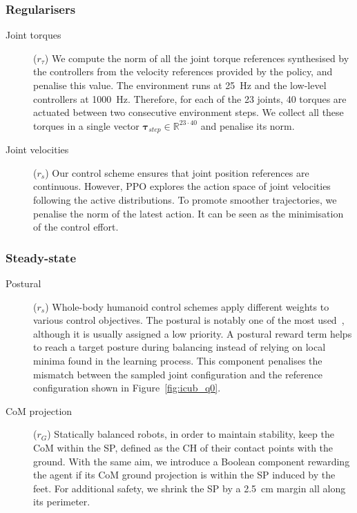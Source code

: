 \pagebreak
\begin{addmargin}{0cm}
\vspace*{-1cm}

\subsubsection{Regularisers}

\begin{description}

\item[Joint torques]\!($r_\tau$)\;
%
We compute the norm of all the joint torque references synthesised by the \pid controllers from the velocity references provided by the policy, and penalise this value.
The environment runs at 25~Hz and the low-level controllers at 1000~Hz.
Therefore, for each of the 23 joints, 40 torques are actuated between two consecutive environment steps.
We collect all these torques in a single vector $\boldsymbol{\tau}_{step} \in \mathbb{R}^{23\cdot40}$ and penalise its norm.

\item[Joint velocities]\!($r_{\dot{s}}$)\;
%
Our control scheme ensures that joint position references are continuous.
However, \ac{PPO} explores the action space of joint velocities following the active distributions.
To promote smoother trajectories, we penalise the norm of the latest action.
It can be seen as the minimisation of the control effort.

\end{description}

\subsubsection{Steady-state}

\begin{description}

\item[Postural]\!($r_s$)\;
%
Whole-body humanoid control schemes apply different weights to various control objectives.
The postural is notably one of the most used~\parencite{nava_stability_2016}, although it is usually assigned a low priority.
A postural reward term helps to reach a target posture during balancing instead of relying on local minima found in the learning process.
This component penalises the mismatch between the sampled joint configuration and the reference configuration shown in Figure~\ref{fig:icub_q0}.

\item[CoM projection]\!($r_{G}$)\;
%
Statically balanced robots, in order to maintain stability, keep the \ac{CoM} within the \ac{SP}, defined as the \ac{CH} of their contact points with the ground.
With the same aim, we introduce a Boolean component rewarding the agent if its \ac{CoM} ground projection is within the \ac{SP} induced by the feet.
For additional safety, we shrink the \ac{SP} by a 2.5~cm margin all along its perimeter.


\end{description}
\end{addmargin}
